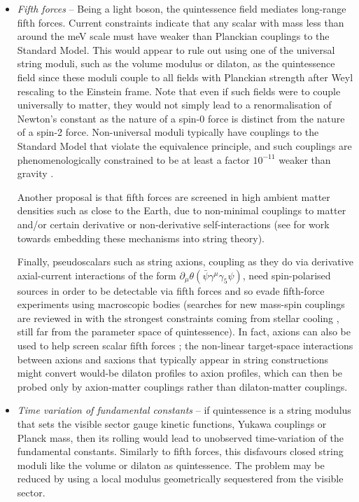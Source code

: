 \begin{itemize}
\item \emph{Fifth forces} -- Being a light boson, the quintessence field mediates long-range fifth forces. Current constraints \cite{Adelberger:2003zx} indicate that any scalar with mass less than around the meV scale must have weaker than Planckian couplings to the Standard Model. This would appear to rule out using one of the universal string moduli, such as the volume modulus or dilaton, as the quintessence field since these moduli couple to all fields with Planckian strength after Weyl rescaling to the Einstein frame. Note that even if such fields were to couple universally to matter, they would not simply lead to a renormalisation of Newton's constant as the nature of a spin-0 force is distinct from the nature of a spin-2 force. Non-universal moduli typically have couplings to the Standard Model that violate the equivalence principle, and such couplings are phenomenologically constrained to be at least a factor $10^{-11}$ weaker than gravity \cite{Damour:2010rp}. 
    
Another proposal is that fifth forces are screened in high ambient matter densities such as close to the Earth, due to non-minimal couplings to matter and/or certain derivative or non-derivative self-interactions \cite{Vainshtein:1972sx, Khoury:2003aq, Feldman:2006wg, Hinterbichler:2010es} (see \cite{Brax:2010gi, Hinterbichler:2010wu} for work towards embedding these mechanisms into string theory).  
    
Finally, pseudoscalars such as string axions, coupling as they do via derivative axial-current interactions of the form $\partial_\mu \theta (\bar{\psi} \gamma^\mu \gamma_5 \psi)$, need spin-polarised sources in order to be detectable via fifth forces and so evade fifth-force experiments using macroscopic bodies (searches for new mass-spin couplings are reviewed in \cite{Marsh:2015xka, Workman:2022ynf} with the strongest constraints coming from stellar cooling \cite{Raffelt:2012sp}, still far from the parameter space of quintessence).  In fact, axions can also be used to help screen scalar fifth forces \cite{Burgess:2021qti,Brax:2022vlf}; the non-linear target-space interactions between axions and saxions that typically appear in string constructions might convert would-be dilaton profiles to axion profiles, which can then be probed only by axion-matter couplings rather than dilaton-matter couplings. 

\item \emph{Time variation of fundamental constants} --  if quintessence is a string modulus that sets the visible sector gauge kinetic functions, Yukawa couplings or Planck mass, then its rolling would lead to unobserved time-variation of the fundamental constants. Similarly to fifth forces, this disfavours closed string moduli like the volume or dilaton as quintessence.  The problem may be reduced by using a local modulus geometrically sequestered from the visible sector. 

\end{itemize}
